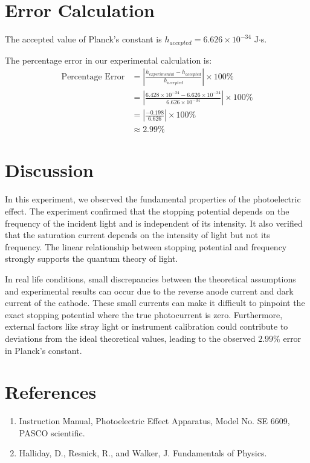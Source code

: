 \documentclass[12pt, a4paper]{article}
\begin{document}
\section{Error Calculation}
The accepted value of Planck's constant is $h_{accepted} = 6.626 \times 10^{-34}$ J$\cdot$s.

The percentage error in our experimental calculation is:
\begin{align*}
    \text{Percentage Error} &= \left| \frac{h_{experimental} - h_{accepted}}{h_{accepted}} \right| \times 100 \% \\
    &= \left| \frac{6.428 \times 10^{-34} - 6.626 \times 10^{-34}}{6.626 \times 10^{-34}} \right| \times 100 \% \\
    &= \left| \frac{-0.198}{6.626} \right| \times 100 \% \\
    &\approx 2.99 \%
\end{align*}

\section{Discussion}
In this experiment, we observed the fundamental properties of the photoelectric effect. The experiment confirmed that the stopping potential depends on the frequency of the incident light and is independent of its intensity. It also verified that the saturation current depends on the intensity of light but not its frequency. The linear relationship between stopping potential and frequency strongly supports the quantum theory of light.

In real life conditions, small discrepancies between the theoretical assumptions and experimental results can occur due to the reverse anode current and dark current of the cathode. These small currents can make it difficult to pinpoint the exact stopping potential where the true photocurrent is zero. Furthermore, external factors like stray light or instrument calibration could contribute to deviations from the ideal theoretical values, leading to the observed $2.99\%$ error in Planck's constant.

\section{References}
\begin{enumerate}
    \item Instruction Manual, Photoelectric Effect Apparatus, Model No. SE 6609, PASCO scientific.
    \item Halliday, D., Resnick, R., and Walker, J. Fundamentals of Physics.
\end{enumerate}
\end{document}
